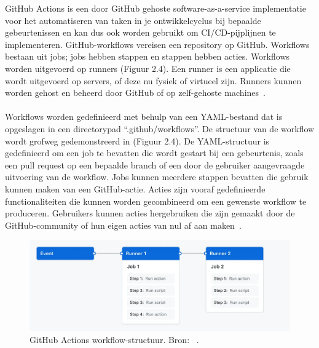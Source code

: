 GitHub Actions is een door GitHub gehoste software-as-a-service implementatie voor het automatiseren van taken in je ontwikkelcyclus bij bepaalde gebeurtenissen en kan dus ook worden gebruikt om CI/CD-pijplijnen te implementeren. GitHub-workflows vereisen een repository op GitHub. Workflows bestaan uit jobs; jobs hebben stappen en stappen hebben acties. Workflows worden uitgevoerd op runners (Figuur 2.4). Een runner is een applicatie die wordt uitgevoerd op servers, of deze nu fysiek of virtueel zijn. Runners kunnen worden gehost en beheerd door GitHub of op zelf-gehoste machines~\autocite{githubActionsIntro}.
\\\\
Workflows worden gedefinieerd met behulp van een YAML-bestand dat is opgeslagen in een directorypad “.github/workflows”. De structuur van de workflow wordt grofweg gedemonstreerd in (Figuur 2.4). De YAML-structuur is gedefinieerd om een job te bevatten die wordt gestart bij een gebeurtenis, zoals een pull request op een bepaalde branch of een door de gebruiker aangevraagde uitvoering van de workflow. Jobs kunnen meerdere stappen bevatten die gebruik kunnen maken van een GitHub-actie. Acties zijn vooraf gedefinieerde functionaliteiten die kunnen worden gecombineerd om een gewenste workflow te produceren. Gebruikers kunnen acties hergebruiken die zijn gemaakt door de GitHub-community of hun eigen acties van nul af aan maken~\autocite{githubActionsIntro}.

\begin{figure}{\textwidth}
    \centering
    \includegraphics[width=0.8\linewidth]{Foto's/overview-actions-simple.png}
    \caption{GitHub Actions workflow-structuur. Bron: ~\autocite{githubActionsIntro}.}
    \label{fig:workflow-structuur}
\end{figure}

